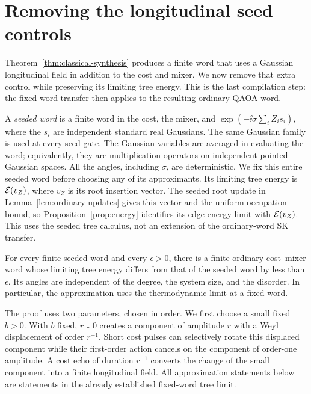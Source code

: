 \section{Removing the longitudinal seed controls}
\label{sec:seed-simulation}

Theorem~\ref{thm:classical-synthesis} produces a finite word that uses a Gaussian
longitudinal field in addition to the cost and mixer.  We now remove
that extra control while preserving its limiting tree energy.  This is
the last compilation step: the fixed-word transfer then applies to the
resulting ordinary QAOA word.

A \emph{seeded word} is a finite word in the cost, the mixer, and
\(\exp(-\ii\sigma\sum_i Z_i s_i)\), where the \(s_i\) are independent
standard real Gaussians.  The same Gaussian family is used at every
seed gate.  The Gaussian variables are averaged in evaluating the word;
equivalently, they are multiplication operators on independent pointed
Gaussian spaces.  All the angles, including \(\sigma\), are deterministic.
We fix this entire seeded word before choosing any of its approximants.
Its limiting tree energy is \(\mathcal E(v_Z)\), where \(v_Z\) is its
root insertion vector. The seeded root update in
Lemma~\ref{lem:ordinary-updates} gives this vector and the uniform
occupation bound, so Proposition~\ref{prop:energy} identifies its
edge-energy limit with \(\mathcal E(v_Z)\). This uses the seeded tree
calculus, not an extension of the ordinary-word SK transfer.

\begin{theorem}
\label{thm:seed-simulation}
For every finite seeded word and every \(\epsilon>0\), there is a finite
ordinary cost--mixer word whose limiting tree energy differs from that of
the seeded word by less than \(\epsilon\).  Its angles are independent of the
degree, the system size, and the disorder.  In particular, the approximation
uses the thermodynamic limit at a fixed word.
\end{theorem}

The proof uses two parameters, chosen in order.  We first choose a small
fixed \(b>0\).  With \(b\) fixed, \(r\downarrow0\) creates a component of
amplitude \(r\) with a Weyl displacement of order \(r^{-1}\).  Short cost pulses can
selectively rotate this displaced component while their first-order action
cancels on the component of order-one amplitude.  A cost echo of duration
\(r^{-1}\) converts the change of the small component into a finite
longitudinal field.  All approximation statements below are statements in
the already established fixed-word tree limit.

